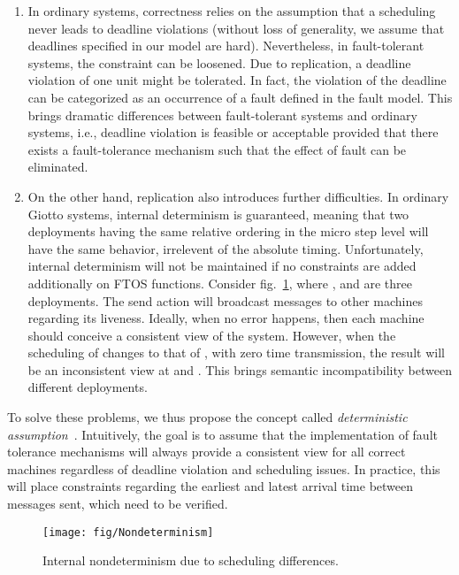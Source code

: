 \documentclass[10pt, a4paper, onecolumn, conference, compsocconf]{IEEEtran}
\begin{document}
\begin{enumerate}
\item In ordinary systems, correctness relies on the assumption that a scheduling never leads to deadline violations (without loss of generality, we assume that deadlines specified in our model are hard). Nevertheless, in fault-tolerant systems, the constraint can be loosened. Due to replication, a deadline violation of one unit might be tolerated. In fact, the violation of the deadline can be categorized as an occurrence of a fault defined in the fault model. This brings dramatic differences between fault-tolerant systems and ordinary systems, i.e., deadline violation is feasible or acceptable provided that there exists a fault-tolerance mechanism such that the effect of fault can be eliminated.
\item On the other hand, replication also introduces further difficulties. In ordinary Giotto systems, internal determinism is guaranteed, meaning that two deployments having the same relative ordering in the
micro step level will have the same behavior, irrelevent of the absolute timing. Unfortunately, internal determinism will not be maintained if
no constraints are added additionally on FTOS functions. Consider fig.~\ref{fig:Nondeterminism}, where ,  and  are three deployments.
The send action will broadcast messages to other machines regarding its liveness. Ideally, when no error happens, then each machine should conceive a consistent view of the system. However, when the scheduling of  changes to that of , with zero time transmission, the result will be an inconsistent view at  and . This brings semantic incompatibility between
different deployments.
\end{enumerate}

To solve these problems, we thus propose the concept called \emph{deterministic assumption}~\cite{Cheng:2009:FTOSVerify}. Intuitively, the goal is to assume that the implementation of fault tolerance mechanisms will always provide a consistent view for all correct machines regardless of deadline violation  and scheduling issues. In practice, this will place constraints regarding the earliest and latest arrival time between messages sent, which need to be verified.

\begin{figure}
 \centering
 \texttt{[image: fig/Nondeterminism]}
 \caption{Internal nondeterminism due to scheduling differences.}
 \label{fig:Nondeterminism}
\end{figure}
\end{document}
